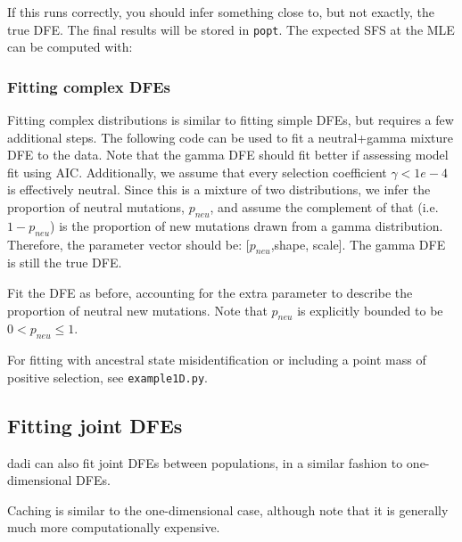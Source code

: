 \documentclass[12pt]{article}
\newcommand{\dadi}{dadi\xspace}
\begin{document}
If this runs correctly, you should infer something close to, but not exactly, the true DFE. The final results will be stored in \texttt{popt}.
The expected SFS at the MLE can be computed with:



\subsubsection{Fitting complex DFEs}

Fitting complex distributions is similar to fitting simple DFEs, but requires a few additional steps. The following code can be used to fit a neutral+gamma mixture DFE to the data. Note that the gamma DFE should fit better if assessing model fit using AIC. Additionally, we assume that every selection coefficient $\gamma < 1e-4$ is effectively neutral. Since this is a mixture of two distributions, we infer the proportion of neutral mutations, $p_{neu}$, and assume the complement of that (i.e. $1-p_{neu}$) is the proportion of new mutations drawn from a gamma distribution. Therefore, the parameter vector should be: [$p_{neu}$,shape, scale]. The gamma DFE is still the true DFE.



Fit the DFE as before, accounting for the extra parameter to describe the proportion of neutral new mutations. Note that $p_{neu}$ is explicitly bounded to be $0 < p_{neu} \leq 1$.



For fitting with ancestral state misidentification or including a point mass of positive selection, see \texttt{example1D.py}.

\subsection{Fitting joint DFEs}

\dadi can also fit joint DFEs between populations, in a similar fashion to one-dimensional DFEs.

Caching is similar to the one-dimensional case, although note that it is generally much more computationally expensive.

\end{document}

